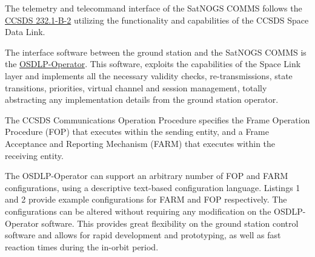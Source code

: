 \documentclass[english,title,a4paper]{report}
\begin{document}
The telemetry and telecommand interface of the SatNOGS COMMS follows the \href{https://public.ccsds.org/Pubs/232x1b2e2c1.pdf}{CCSDS 232.1-B-2} utilizing the functionality and capabilities of the CCSDS Space Data Link.

The interface software between the ground station and the SatNOGS COMMS is the \href{https://gitlab.com/librespacefoundation/osdlp-operator}{OSDLP-Operator}.
This software, exploits the capabilities of the Space Link layer and implements all the necessary validity checks, re-transmissions, state transitions, priorities, virtual channel and session management, totally abstracting any implementation details from the ground station operator.

The CCSDS Communications Operation Procedure specifies the Frame Operation Procedure (FOP) that executes within the sending entity, and a Frame Acceptance and Reporting Mechanism (FARM) that executes within the receiving entity.

The OSDLP-Operator can support an arbitrary number of FOP and FARM configurations, using a descriptive text-based configuration language.
Listings 1 and 2 provide example configurations for FARM and FOP respectively.
The configurations can be altered without requiring any modification on the OSDLP-Operator software.
This provides great flexibility on the ground station control software and allows for rapid development and prototyping, as well as fast reaction times during the in-orbit period.
\end{document}
